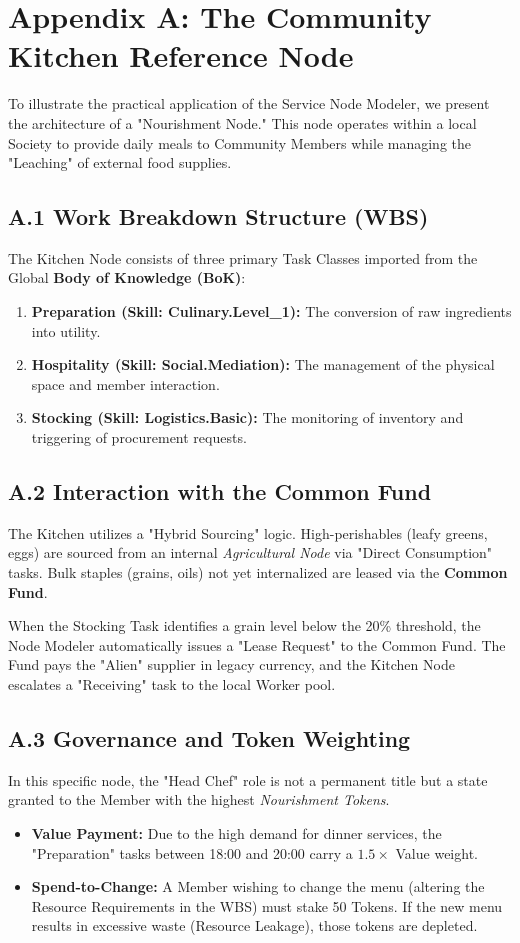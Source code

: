 \section*{Appendix A: The Community Kitchen Reference Node}

To illustrate the practical application of the Service Node Modeler, we present the architecture of a "Nourishment Node." This node operates within a local Society to provide daily meals to Community Members while managing the "Leaching" of external food supplies.

\subsection*{A.1 Work Breakdown Structure (WBS)}
The Kitchen Node consists of three primary Task Classes imported from the Global \textbf{Body of Knowledge (BoK)}:
\begin{enumerate}
    \item \textbf{Preparation (Skill: Culinary.Level\_1):} The conversion of raw ingredients into utility.
    \item \textbf{Hospitality (Skill: Social.Mediation):} The management of the physical space and member interaction.
    \item \textbf{Stocking (Skill: Logistics.Basic):} The monitoring of inventory and triggering of procurement requests.
\end{enumerate}

\subsection*{A.2 Interaction with the Common Fund}
The Kitchen utilizes a "Hybrid Sourcing" logic. High-perishables (leafy greens, eggs) are sourced from an internal \textit{Agricultural Node} via "Direct Consumption" tasks. Bulk staples (grains, oils) not yet internalized are leased via the \textbf{Common Fund}. 

When the Stocking Task identifies a grain level below the 20\% threshold, the Node Modeler automatically issues a "Lease Request" to the Common Fund. The Fund pays the "Alien" supplier in legacy currency, and the Kitchen Node escalates a "Receiving" task to the local Worker pool.

\subsection*{A.3 Governance and Token Weighting}
In this specific node, the "Head Chef" role is not a permanent title but a state granted to the Member with the highest \textit{Nourishment Tokens}. 
\begin{itemize}
    \item \textbf{Value Payment:} Due to the high demand for dinner services, the "Preparation" tasks between 18:00 and 20:00 carry a $1.5\times$ Value weight.
    \item \textbf{Spend-to-Change:} A Member wishing to change the menu (altering the Resource Requirements in the WBS) must stake 50 Tokens. If the new menu results in excessive waste (Resource Leakage), those tokens are depleted.
\end{itemize}

